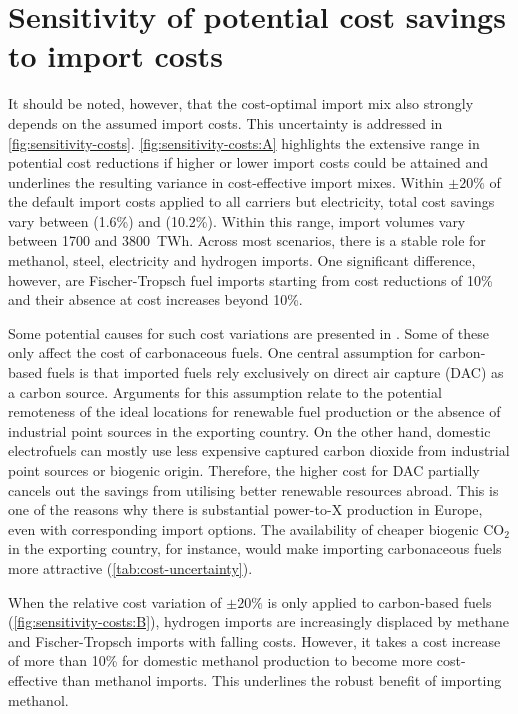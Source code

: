 \section*{Sensitivity of potential cost savings to import costs}

It should be noted, however, that the cost-optimal import mix also strongly
depends on the assumed import costs. This uncertainty is addressed in
\cref{fig:sensitivity-costs}. \cref{fig:sensitivity-costs:A} highlights the
extensive range in potential cost reductions if higher or lower import costs
could be attained and underlines the resulting variance in cost-effective import
mixes. Within $\pm 20\%$ of the default import costs applied to all carriers but
electricity, total cost savings vary between  (1.6\%) and 
(10.2\%). Within this range, import volumes vary between 1700 and 3800~TWh.
Across most scenarios, there is a stable role for methanol, steel, electricity
and hydrogen imports. One significant difference, however, are Fischer-Tropsch
fuel imports starting from cost reductions of 10\% and their absence at cost
increases beyond 10\%.

Some potential causes for such cost variations are presented in
. Some of these only affect the cost of
carbonaceous fuels. One central assumption for carbon-based fuels is that
imported fuels rely exclusively on direct air capture (DAC) as a carbon source.
Arguments for this assumption relate to the potential remoteness of the ideal
locations for renewable fuel production or the absence of industrial point
sources in the exporting country. On the other hand, domestic electrofuels can
mostly use less expensive captured carbon dioxide from industrial point sources
or biogenic origin. Therefore, the higher cost for DAC partially cancels out the
savings from utilising better renewable resources abroad. This is one of the
reasons why there is substantial power-to-X production in Europe, even with
corresponding import options. The availability of cheaper biogenic CO$_2$ in the
exporting country, for instance, would make importing carbonaceous fuels more
attractive (\cref{tab:cost-uncertainty}).

When the relative cost variation of $\pm 20\%$ is only applied to carbon-based
fuels (\cref{fig:sensitivity-costs:B}), hydrogen imports are increasingly
displaced by methane and Fischer-Tropsch imports with falling costs. However, it
takes a cost increase of more than 10\% for domestic methanol production to
become more cost-effective than methanol imports. This underlines the robust
benefit of importing methanol.

